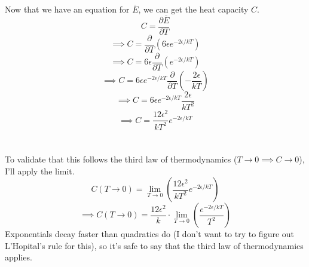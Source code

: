\documentclass[12pt]{article}
\newcommand{\partDeriv}[2]{\frac{\partial #1}{\partial #2}}
\begin{document}
\begin{flushleft}
Now that we have an equation for $\overline{E}$, we can get the heat capacity $C$.
$$C=\partDeriv{\overline{E}}{T}$$
$$\implies C=\partDeriv{}{T}(6\epsilon e^{-2\epsilon/kT})$$
$$\implies C=6\epsilon \partDeriv{}{T}(e^{-2\epsilon/kT})$$
$$\implies C=6\epsilon e^{-2\epsilon/kT}\partDeriv{}{T}(-\frac{2\epsilon}{kT})$$
$$\implies C=6\epsilon e^{-2\epsilon/kT}\frac{2\epsilon}{kT^2}$$
$$\implies C=\frac{12\epsilon^2}{kT^2}e^{-2\epsilon/kT}$$\\~\\

To validate that this follows the third law of thermodynamics ($T\rightarrow0\implies C\rightarrow0$), I'll apply the limit.
$$C(T\rightarrow0)=\lim_{T\rightarrow0}\left(\frac{12\epsilon^2}{kT^2}e^{-2\epsilon/kT}\right)$$
$$\implies C(T\rightarrow0)=\frac{12\epsilon^2}{k}\cdot\lim_{T\rightarrow0}\left(\frac{e^{-2\epsilon/kT}}{T^2}\right)$$
Exponentials decay faster than quadratics do (I don't want to try to figure out L'Hopital's rule for this), so it's safe to say that the third law of thermodynamics applies.



\end{flushleft}
\end{document}
